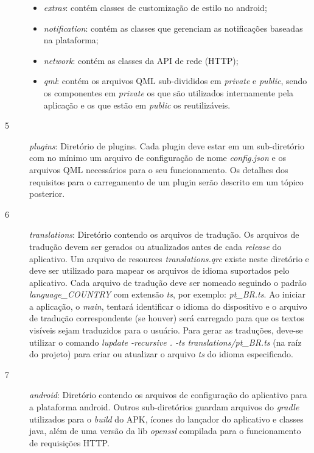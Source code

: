 \begin{description}
\begin{itemize}
		\item \textit{extras}: contém classes de customização de estilo no android;

		\item \textit{notification}: contém as classes que gerenciam as notificações baseadas na plataforma;

		\item \textit{network}: contém as classes da API de rede (HTTP);

		\item \textit{qml}: contém os arquivos QML sub-divididos em \textit{private} e \textit{public}, sendo os componentes em \textit{private} os que são utilizados internamente pela aplicação e os que estão em \textit{public} os reutilizáveis.
	\end{itemize}

	\item[5] \textit{plugins}: Diretório de plugins. Cada plugin deve estar em um sub-diretório com no mínimo um arquivo de configuração de nome \textit{config.json} e os arquivos QML necessários para o seu funcionamento. Os detalhes dos requisitos para o carregamento de um plugin serão descrito em um tópico posterior.

	\item[6] \textit{translations}: Diretório contendo os arquivos de tradução. Os arquivos de tradução devem ser gerados ou atualizados antes de cada \textit{release} do aplicativo. Um arquivo de resources \textit{translations.qrc} existe neste diretório e deve ser utilizado para mapear os arquivos de idioma suportados pelo aplicativo. Cada arquivo de tradução deve ser nomeado seguindo o padrão \textit{language\_COUNTRY} com extensão \textit{ts}, por exemplo: \textit{pt\_BR.ts}. Ao iniciar a aplicação, o \textit{main}, tentará identificar o idioma do dispositivo e o arquivo de tradução correspondente (se houver) será carregado para que os textos visíveis sejam traduzidos para o usuário. Para gerar as traduções, deve-se utilizar o comando \textit{lupdate -recursive . -ts translations/pt\_BR.ts} (na raíz do projeto) para criar ou atualizar o arquivo \textit{ts} do idioma especificado.

	\item[7] \textit{android}: Diretório contendo os arquivos de configuração do aplicativo para a plataforma android. Outros sub-diretórios guardam arquivos do \textit{gradle} utilizados para o \textit{build} do APK, ícones do lançador do aplicativo e classes java, além de uma versão da lib \textit{openssl} compilada para o funcionamento de requisições HTTP.


\end{description}
